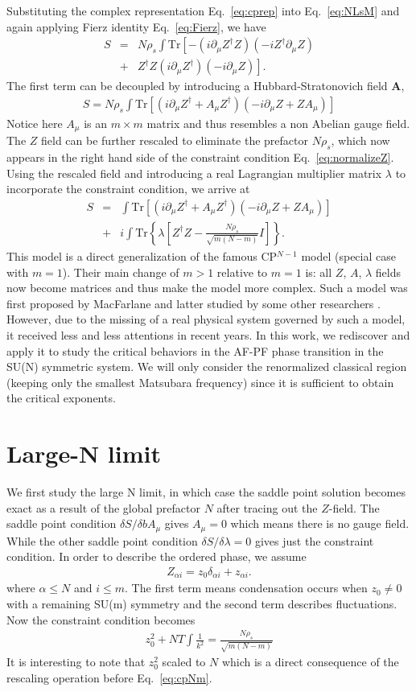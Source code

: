\documentclass[aps,twocolumn,superscriptaddress]{revtex4-1}
\newcommand{\bea}{\begin{eqnarray}}
\newcommand{\eea}{\end{eqnarray}}
\newcommand{\bA}{\mathbf{A}}
\begin{document}
Substituting the complex representation Eq.~\ref{eq:cprep} into Eq.~\ref{eq:NLsM} and again applying Fierz identity Eq.~\ref{eq:Fierz}, we have
\bea S &=& N\rho_s \int\mathrm{Tr}\left[-(i\partial_\mu Z^\dagger Z) (-iZ^\dag \partial_\mu Z) \right. \nonumber\\  &+& \left. Z^\dag Z (i\partial_\mu Z^\dagger)(-i\partial_\mu Z)\right] .\eea
The first term can be decoupled by introducing a Hubbard-Stratonovich field $\bA$, 
\bea S=N\rho_s\int \mathrm{Tr}\left[ (i\partial_\mu Z^\dag+A_\mu Z^\dag)(-i\partial_\mu Z+ZA_\mu)  \right] \eea
Notice here $A_\mu$ is an $m\times m$ matrix and thus resembles a non Abelian gauge field.
The $Z$ field can be further rescaled to eliminate the prefactor $N\rho_s$, which now appears in the right hand side of the constraint condition Eq.~\ref{eq:normalizeZ}. Using the rescaled field and introducing a real Lagrangian multiplier matrix $\lambda$ to incorporate the constraint condition, we arrive at
\bea \label{eq:cpNm} S&=&\int \mathrm{Tr}\left[ (i\partial_\mu Z^\dag+A_\mu Z^\dag)(-i\partial_\mu Z+ZA_\mu)  \right] \nonumber \\ &+& i\int \mathrm{Tr}\left\{\lambda\left[Z^\dag Z-\frac{N\rho_s}{\sqrt{m(N-m)}}I\right]\right\} . \eea 
This model is a direct generalization of the famous CP$^{N-1}$ model \cite{} (special case with $m=1$). Their main change of $m>1$ relative to $m=1$ is: all $Z$, $A$, $\lambda$ fields now become matrices and thus make the model more complex. Such a model was first proposed by MacFarlane \cite{} and latter studied by some other researchers \cite{Hikomi, Duerksen, Read&Sachdev}. However, due to the missing of a real physical system governed by such a model, it received less and less attentions in recent years. In this work, we rediscover and apply it to study the critical behaviors in the AF-PF phase transition in the SU(N) symmetric system. We will only consider the renormalized classical region (keeping only the smallest Matsubara frequency) since it is sufficient to obtain the critical exponents. \cite{IKK}

\section{Large-N limit}
We first study the large N limit, in which case the saddle point solution becomes exact as a result of the global prefactor $N$ after tracing out the $Z$-field. The saddle point condition $\delta S/\delta bA_\mu$ gives $A_\mu=0$ which means there is no gauge field. While the other saddle point condition $\delta S/\delta \lambda=0$ gives just the constraint condition. In order to describe the ordered phase, we assume 
\bea Z_{\alpha i}=z_0\delta_{\alpha i}+z_{\alpha i}. \eea 
where $\alpha\le N$ and $i\le m$. The first term means condensation occurs when $z_0\ne0$ with a remaining SU(m) symmetry and the second term describes fluctuations. Now the constraint condition becomes
\bea \label{eq:Ninfty} z_0^2 + NT\int \frac{1}{k^2} = \frac{N\rho_s}{\sqrt{m(N-m)}} \eea
It is interesting to note that $z_0^2$ scaled to $N$ which is a direct consequence of the rescaling operation before Eq.~\ref{eq:cpNm}. 
\end{document}

